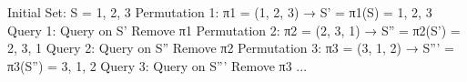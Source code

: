 Initial Set: S = {1, 2, 3}
Permutation 1: π1 = (1, 2, 3) → S' = π1(S) = {1, 2, 3}
Query 1: Query on S'
Remove π1
Permutation 2: π2 = (2, 3, 1) → S'' = π2(S') = {2, 3, 1}
Query 2: Query on S''
Remove π2
Permutation 3: π3 = (3, 1, 2) → S''' = π3(S'') = {3, 1, 2}
Query 3: Query on S'''
Remove π3
...